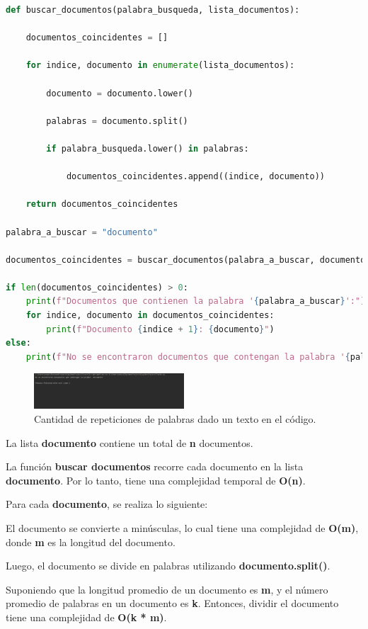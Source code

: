 \documentclass[journal, spanish]{IEEEtran}
\begin{document}
\begin{lstlisting}[language=Python]
def buscar_documentos(palabra_busqueda, lista_documentos):

    documentos_coincidentes = []

    for indice, documento in enumerate(lista_documentos):

        documento = documento.lower()

        palabras = documento.split()

        if palabra_busqueda.lower() in palabras:

            documentos_coincidentes.append((indice, documento))

    return documentos_coincidentes

palabra_a_buscar = "documento"

documentos_coincidentes = buscar_documentos(palabra_a_buscar, documento)

if len(documentos_coincidentes) > 0:
    print(f"Documentos que contienen la palabra '{palabra_a_buscar}':")
    for indice, documento in documentos_coincidentes:
        print(f"Documento {indice + 1}: {documento}")
else:
    print(f"No se encontraron documentos que contengan la palabra '{palabra_a_buscar}'.")
\end{lstlisting}

\begin{figure}[H]
  \centering
  \includegraphics[width=0.5\textwidth]{images/IMG-20230913-WA0002.jpg}
  \caption{Cantidad de repeticiones de palabras dado un texto en el código.}
  \label{fig:nombre_de_tu_imagen}
\end{figure}

La lista \textbf{documento} contiene un total de \textbf{n} documentos.

La función \textbf{buscar documentos} recorre cada documento en la lista \textbf{documento}. Por lo tanto, tiene una complejidad temporal de \textbf{O(n)}.

Para cada \textbf{documento}, se realiza lo siguiente:

El documento se convierte a minúsculas, lo cual tiene una complejidad de \textbf{O(m)}, donde \textbf{m} es la longitud del documento.

Luego, el documento se divide en palabras utilizando \textbf{documento.split()}. 

Suponiendo que la longitud promedio de un documento es \textbf{m}, y el número promedio de palabras en un documento es \textbf{k}. Entonces, dividir el documento tiene una complejidad de \textbf{O(k * m)}.
\end{document}
